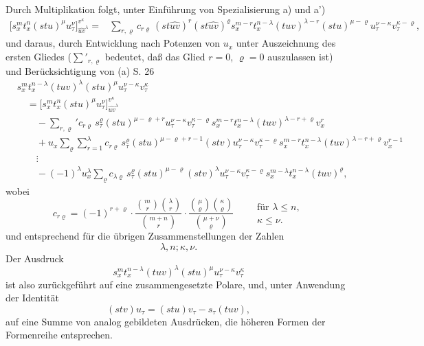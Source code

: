 \documentclass[11pt]{article}
\begin{document}
Durch Multiplikation folgt, unter Einführung von Spezialisierung a) und a')
\[
\begin{aligned}
\bigl[s_x^m t_x^n(stu)^\mu u_\tau^\nu\bigr]_{\widehat{uv}^{\lambda}}^{v^\kappa}
={}&
\sum_{r,\varrho}c_{r\varrho}\,
(st\widehat{uv})^r(st\widehat{uv})^\varrho
s_x^{m-r}t_x^{n-\lambda}(tuv)^{\lambda-r}(stu)^{\mu-\varrho}
u_\tau^{\nu-\kappa}v_\tau^{\kappa-\varrho},
\end{aligned}
\]
und daraus, durch Entwicklung nach Potenzen von $u_x$ unter Auszeichnung des ersten Gliedes ($\sum'_{r,\varrho}$ bedeutet, daß das Glied $r=0$, $\varrho=0$ auszulassen ist) und Berücksichtigung von (a) S. 26
\[
\tag{II}
\begin{aligned}
&s_x^m t_x^{n-\lambda}(tuv)^\lambda(stu)^\mu u_\tau^{\nu-\kappa}v_\tau^\kappa\\
&\quad =
\bigl[s_x^m t_x^n(stu)^\mu u_\tau^\nu\bigr]_{\widehat{uv}^{\lambda}}^{v^\kappa}\\
&\qquad
-\sum_{r,\varrho}' c_{r\varrho}\,s_\tau^\varrho(stu)^{\mu-\varrho+r}
u_\tau^{\nu-\kappa}v_\tau^{\kappa-\varrho}
s_x^{m-r}t_x^{n-\lambda}(tuv)^{\lambda-r+\varrho}v_x^r\\
&\qquad
+u_x\sum_{\varrho}\sum_{r=1}^{\lambda} c_{r\varrho}\,
s_\tau^\varrho(stu)^{\mu-\varrho+r-1}(stv)
u_\tau^{\nu-\kappa}v_\tau^{\kappa-\varrho}
s_x^{m-r}t_x^{n-\lambda}(tuv)^{\lambda-r+\varrho}v_x^{r-1}\\
&\qquad
\vdots\\
&\qquad
-(-1)^\lambda u_x^\lambda\sum_\varrho c_{\lambda\varrho}\,
s_\tau^\varrho(stu)^{\mu-\varrho}(stv)^\lambda
u_\tau^{\nu-\kappa}v_\tau^{\kappa-\varrho}
s_x^{m-\lambda}t_x^{n-\lambda}(tuv)^\varrho,
\end{aligned}
\]
wobei
\[
c_{r\varrho}=(-1)^{r+\varrho}\cdot
\frac{\binom{m}{r}\binom{\lambda}{r}}{\binom{m+n}{r}}\cdot
\frac{\binom{\mu}{\varrho}\binom{\kappa}{\varrho}}{\binom{\mu+\nu}{\varrho}}
\qquad
\begin{array}{l}
\text{für }\lambda\le n,\\
\kappa\le\nu.
\end{array}
\]
und entsprechend für die übrigen Zusammenstellungen der Zahlen
\[\lambda,n;\kappa,\nu.\]
Der Ausdruck
\[s_x^m t_x^{n-\lambda}(tuv)^\lambda(stu)^\mu u_\tau^{\nu-\kappa}v_\tau^\kappa\]
ist also zurückgeführt auf eine zusammengesetzte Polare, und, unter Anwendung der Identität
\[
(stv)u_\tau=(stu)v_\tau-s_\tau(tuv),
\]
auf eine Summe von analog gebildeten Ausdrücken, die höheren Formen der Formenreihe entsprechen.
\end{document}
